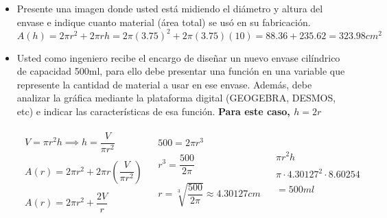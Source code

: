 \documentclass[12pt]{article}
\begin{document}
\begin{itemize}
  \item Presente una imagen donde usted está midiendo el diámetro y altura del envase e 
  indique cuanto material (área total) se usó en su fabricación.
  \[
    A(h) = 2\pi r^2 + 2\pi rh = 2\pi (3.75)^2 + 2\pi (3.75)(10) = 88.36 + 235.62 = 323.98cm^2
  \]
  \item Usted como ingeniero recibe el encargo de diseñar un nuevo envase cilíndrico de
  capacidad 500ml, para ello debe presentar una función en una variable que
  represente la cantidad de material a usar en ese envase. Además, debe analizar la
  gráfica mediante la plataforma digital (GEOGEBRA, DESMOS, etc) e indicar las
  características de esa función. \textbf{Para este caso, $h=2r$}
  \vspace{-0.75cm}
  \begin{center}
    \[
    \begin{array}{l|l|l}
      \begin{array}{l}
        V = \pi r^2 h \implies h = \dfrac{V}{\pi r^2} \\\\
        A(r) = 2\pi r^2 + 2\pi r\left(\dfrac{V}{\pi r^2}\right) \\\\
        A(r) = 2\pi r^2 + \dfrac{2V}{r}
      \end{array}
      &
      \begin{array}{l}
        500 = 2\pi r^3 \\\\
        r^3 = \dfrac{500}{2\pi} \\\\
        r = \sqrt[3]{\dfrac{500}{2\pi}} \approx 4.30127cm
      \end{array}
      &
      \begin{array}{l}
        \pi r^2 h \\\\
        \pi \cdot 4.30127^2 \cdot 8.60254\\\\
        = 500ml
      \end{array}
    \end{array}
    \]
  \end{center}
  \begin{center}
\end{center}
\end{itemize}
\end{document}
